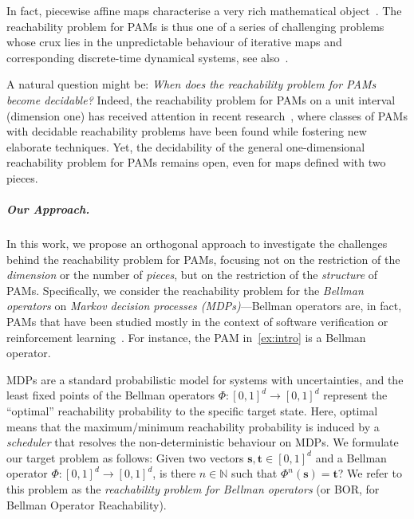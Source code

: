 \documentclass[preprint,12pt]{elsarticle}
\theoremstyle{plain}
\theoremstyle{definition}
\theoremstyle{remark}
\theoremstyle{claimstyle}
\newcommand{\NN}{\mathbb{N}}
\begin{document}
In fact, piecewise affine maps characterise a very rich mathematical object~\cite{Bell2008undec,blondel2000survey}.
The reachability problem for PAMs is thus one of a series of challenging problems
whose crux lies in the unpredictable behaviour of iterative maps 
and corresponding discrete-time dynamical systems, see also~\cite{Bell2008undec,ChonevOW15,Karimov2022dynsys,Tiwari2005termination}.






A natural question might be: \emph{When does the reachability problem for PAMs become decidable?}	
Indeed, the reachability problem for PAMs on a unit interval (dimension one) has received attention in recent research~\cite{bournez2018onedpam,ghahremani2023injective,kuijpers2021skew},
where classes of PAMs with decidable reachability problems have been found
while fostering new elaborate techniques.
Yet, the decidability of the general one-dimensional reachability problem for PAMs remains open,
even for maps defined with two pieces.

\subparagraph{Our Approach.}
In this work, we propose an orthogonal approach to investigate the challenges behind the reachability problem for PAMs, focusing not on the restriction of the \emph{dimension} or the number of \emph{pieces},
but on the restriction of the \emph{structure} of PAMs.
Specifically, we consider the reachability problem for the \emph{Bellman operators} on \emph{Markov decision processes (MDPs)}---Bellman operators are, in fact, PAMs that have been studied mostly in the context of software verification or reinforcement learning~\cite{bk,bellman1957mdp,Puterman94}.
For instance, the PAM in~\cref{ex:intro} is a Bellman operator.

MDPs are a standard probabilistic model for systems with uncertainties, and the least fixed points of the Bellman operators $\Phi\colon [0, 1]^{d}\rightarrow [0, 1]^{d}$ represent the ``optimal'' reachability probability to the specific target state. 
Here, optimal means that the maximum/minimum reachability probability is induced by a \emph{scheduler} that resolves the non-deterministic behaviour on MDPs. 
We formulate our target problem as follows: Given two vectors $\bm{s}, \bm{t}\in [0, 1]^{d}$ and a Bellman operator $\Phi\colon [0, 1]^{d}\rightarrow [0, 1]^{d}$, is there $n\in \NN$ such that $\Phi^{n}(\bm{s}) = \bm{t}$?
We refer to this problem as the \emph{reachability problem for Bellman operators} (or BOR, for Bellman Operator Reachability).
\end{document}
